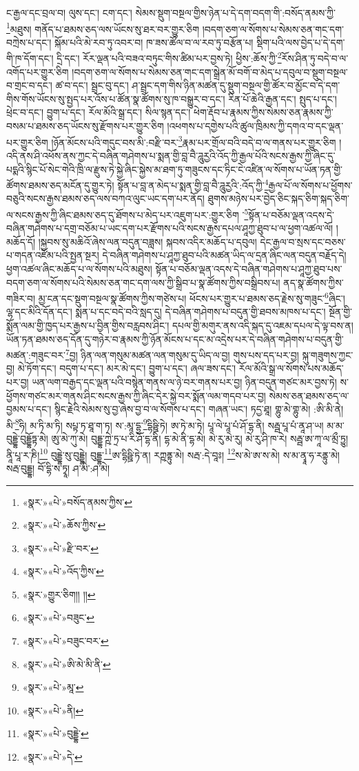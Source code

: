 ང་རྒྱལ་དང་བྲལ་བ། ལུས་དང་། ངག་དང་། སེམས་སྡུག་བསྔལ་གྱིས་ཉེན་པ་དེ་དག་བདག་གི་:བསོད་ནམས་ཀྱི་\footnote{«སྣར་»«པེ་»བསོད་ནམས་ཀྱིས་}མཐུས། གནོད་པ་ཐམས་ཅད་ལས་ཡོངས་སུ་ཐར་བར་གྱུར་ཅིག །བདག་ཅག་ལ་སོགས་པ་སེམས་ཅན་གང་དག་བཀྲེས་པ་དང་། སྐོམ་པའི་མེ་རབ་ཏུ་འབར་བ། ཁ་ཟས་ཚོལ་བ་ལ་རབ་ཏུ་བརྩོན་པ། སྡིག་པའི་ལས་བྱེད་པ་དེ་དག་གི་ཁ་དོག་དང་། དྲི་དང་། རོར་ལྡན་པའི་བཟའ་བཏུང་གིས་ཚིམ་པར་བྱས་ཏེ། ཕྱིས་:ཆོས་ཀྱི་\footnote{«སྣར་»«པེ་»ཆོས་ཀྱིས་}རོས་ཤིན་ཏུ་བདེ་བ་ལ་འགོད་པར་གྱུར་ཅིག །བདག་ཅག་ལ་སོགས་པ་སེམས་ཅན་གང་དག་སྒྲེན་མོ་བགོ་བ་མེད་པ་དབུལ་བ་སྡུག་བསྔལ་བ་གྲང་བ་དང་། ཚ་བ་དང་། སྦྲང་བུ་དང་། ཤ་སྦྲང་དག་གིས་ཉིན་མཚན་དུ་སྡུག་བསྔལ་གྱི་ཚོར་བ་མྱོང་བ་དེ་དག་གིས་གོས་ཡོངས་སུ་སྤྱད་པར་འོས་པ་ཚོན་སྣ་ཚོགས་སུ་ཁ་བསྒྱུར་བ་དང་། རིན་པོ་ཆེའི་རྒྱན་དང་། སྤུད་པ་དང་། ཕྲེང་བ་དང་། བྱུག་པ་དང་། རོལ་མོའི་སྒྲ་དང་། སིལ་སྙན་དང་། ཕེག་རྡོབ་པ་རྣམས་ཀྱིས་སེམས་ཅན་རྣམས་ཀྱི་བསམ་པ་ཐམས་ཅད་ཡོངས་སུ་རྫོགས་པར་གྱུར་ཅིག །འཕགས་པ་དགྱེས་པའི་ཚུལ་ཁྲིམས་ཀྱི་དགའ་བ་དང་ལྡན་པར་གྱུར་ཅིག །ཉོན་མོངས་པའི་གདུང་བས་མི་:བརྫི་བར་\footnote{«སྣར་»«པེ་»རྫི་བར་}རྣམ་པར་གྲོལ་བའི་བདེ་བ་ལ་གནས་པར་གྱུར་ཅིག །འདི་ནས་ཤི་འཕོས་ནས་ཀྱང་དེ་བཞིན་གཤེགས་པ་སྨན་གྱི་བླ་བཻ་ཌཱུརྱའི་འོད་ཀྱི་རྒྱལ་པོའི་སངས་རྒྱས་ཀྱི་ཞིང་དུ་པདྨའི་སྙིང་པོ་སེང་གེའི་ཁྲི་ལ་རྫུས་ཏེ་སྐྱེ་ཞིང་སྐྱེས་མ་ཐག་ཏུ་གཟུངས་དང་ཏིང་ངེ་འཛིན་ལ་སོགས་པ་ཡོན་ཏན་གྱི་ཚོགས་ཐམས་ཅད་མངོན་དུ་གྱུར་ཏེ། སྟོན་པ་བླ་ན་མེད་པ་སྨན་གྱི་བླ་བཻ་ཌཱུརྱའི་:འོད་ཀྱི་\footnote{«སྣར་»«པེ་»འོད་ཀྱིས་}རྒྱལ་པོ་ལ་སོགས་པ་ཕྱོགས་བཅུའི་སངས་རྒྱས་ཐམས་ཅད་ལས་བཀའ་ལུང་ཡང་དག་པར་ནོད། ཐུགས་མཉེས་པར་བྱེད་ཅིང་སྐད་ཅིག་སྐད་ཅིག་ལ་སངས་རྒྱས་ཀྱི་ཞིང་ཐམས་ཅད་དུ་ཐོགས་པ་མེད་པར་འཇུག་པར་:གྱུར་ཅིག ་\footnote{«སྣར་»གྱུར་ཅིག།། །།}སྟོན་པ་བཅོམ་ལྡན་འདས་དེ་བཞིན་གཤེགས་པ་དགྲ་བཅོམ་པ་ཡང་དག་པར་རྫོགས་པའི་སངས་རྒྱས་དཔལ་ཤཱཀྱ་ཐུབ་པ་ལ་ཕྱག་འཚལ་ལོ། །མཆོད་དོ། །སྐྱབས་སུ་མཆིའོ་ཞེས་ལན་བདུན་བཟླས། སྐབས་འདིར་མཆོད་པ་དབུལ། དེང་རྒྱལ་བ་སྲས་དང་བཅས་པ་གདན་འཛོམ་པའི་སྤྱན་སྔར། དེ་བཞིན་གཤེགས་པ་ཤཱཀྱ་ཐུབ་པའི་མཚན་ཡིད་ལ་དྲན་ཞིང་ལན་བདུན་བརྗོད་དེ། ཕྱག་འཚལ་ཞིང་མཆོད་པ་ལ་སོགས་པའི་མཐུས། སྟོན་པ་བཅོམ་ལྡན་འདས་དེ་བཞིན་གཤེགས་པ་ཤཱཀྱ་ཐུབ་པས་བདག་ཅག་ལ་སོགས་པའི་སེམས་ཅན་གང་དག་ལས་ཀྱི་སྒྲིབ་པ་སྣ་ཚོགས་ཀྱིས་བསྒྲིབས་པ། ནད་སྣ་ཚོགས་ཀྱིས་གཟིར་བ། མྱ་ངན་དང་སྡུག་བསྔལ་སྣ་ཚོགས་ཀྱིས་གཙེས་པ། ཕོངས་པར་གྱུར་པ་ཐམས་ཅད་རྗེས་སུ་གཟུང་\footnote{«སྣར་»«པེ་»བཟུང་}ཞིང་། ལྷ་དང་མིའི་དོན་དང་། སྨན་པ་དང་བདེ་བའི་སླད་དུ། དེ་བཞིན་གཤེགས་པ་བདུན་གྱི་ཐབས་མཁས་པ་དང་། སྔོན་གྱི་སྨོན་ལམ་གྱི་ཁྱད་པར་རྒྱས་པ་བྱིན་གྱིས་བརླབས་ཤིང་། དཔལ་གྱི་མགུར་ནས་འདི་སྐད་དུ་འཇམ་དཔལ་དེ་ལྟ་བས་ན། ཡོན་ཏན་ཐམས་ཅད་དོན་དུ་གཉེར་བ་རྣམས་ཀྱི་ཉོན་མོངས་པ་དང་མ་འདྲེས་པར་དེ་བཞིན་གཤེགས་པ་བདུན་གྱི་མཚན་:གཟུང་བར་\footnote{«སྣར་»«པེ་»བཟུང་བར་}བྱ། ཉིན་ལན་གསུམ་མཚན་ལན་གསུམ་དུ་ཡིད་ལ་བྱ། གུས་པས་དད་པར་བྱ། སྐུ་གཟུགས་ཀྱང་བྱ། མེ་ཏོག་དང་། བདུག་པ་དང་། མར་མེ་དང་། བྱུག་པ་དང་། ཞལ་ཟས་དང་། རོལ་མོའི་སྒྲ་ལ་སོགས་པས་མཆོད་པར་བྱ། ཡན་ལག་བརྒྱད་དང་ལྡན་པའི་བསྙེན་གནས་ལ་ཉེ་བར་གནས་པར་བྱ། ཉིན་བདུན་གཙང་མར་བྱས་ཏེ། ས་ཕྱོགས་གཙང་མར་གནས་ཤིང་སངས་རྒྱས་ཀྱི་ཞིང་དེར་སྐྱེ་བར་སྨོན་ལམ་གདབ་པར་བྱ། སེམས་ཅན་ཐམས་ཅད་ལ་བྱམས་པ་དང་། སྙིང་རྗེའི་སེམས་སུ་བྱ་ཞེས་བྱ་བ་ལ་སོགས་པ་དང་། གཞན་ཡང་། ཏདྱ་ཐཱ། གྷུ་མེ་གྷུ་མེ། :ཨི་མི་ནེ། མི་\footnote{«སྣར་»«པེ་»ཨི་མེ་མི་ནི་}ཧི། མ་ཏི་མ་ཏི། སཔྟ་ཏ་ཐཱ་ག་ཏ། ས་:མཱ་དྷྱ་\footnote{«སྣར་»«པེ་»མཱ་}དྷིཥྛི་ཏེ། ཨ་ཏེ་མ་ཏེ། པཱ་ལེ་པཱ་པཾ་ཤོ་དྷ་ནི། སརྦྦ་པཱ་པཾ་ནཱ་ཤ་ཡ། མ་མ་བུདྡྷེ་བུདྡྷོཏྟ་མེ། ཨུ་མེ་ཀུ་མེ། བུདྡྷ་ཀྵེ་ཏྲ་པ་རི་ཤོ་དྷ་ནི། དྷ་མེ་ནི་དྷ་མེ། མེ་རུ་མེ་རུ། མེ་རུ་ཤི་ཁ་རེ། སརྦྦ་ཨ་ཀཱ་ལ་མྲྀ་ཏྱུ། ནཱི་པཱ་ར་ཎི།\footnote{«སྣར་»«པེ་»ནི།} བུདྡྷེ་སུ་བུདྡྷེ། བུདྡྷ་\footnote{«སྣར་»«པེ་»བུདྡྷེ་}ཨ་དྷིཥྛི་ཏེ་ན། རཀྵནྟུ་མེ། སརྦ་:དེ་བཱཿ། \footnote{«སྣར་»«པེ་»དེ་}ས་མེ་ཨ་ས་མེ། ས་མ་ནྭཱ་ཧ་རནྟུ་མེ། སརྦ་བུདྡྷ། བོ་དྷི་ས་ཏྭཱ། ཤ་མེ་:ཤ་མེ། 